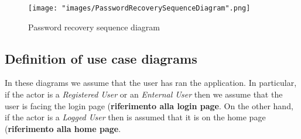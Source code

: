 \begin{figure}[H]
\begin{center}
\texttt{[image: "images/PasswordRecoverySequenceDiagram".png]}
\caption{Password recovery sequence diagram}
\label{img:seqDiagrPasswordRecovery}
\end{center}
\end{figure}



\subsection{Definition of use case diagrams}
In these diagrams we assume that the user has ran the application. In particular, if the actor is a \textit{Registered User} or an \textit{Enternal User} then we assume that the user is facing the login page (\textbf{riferimento alla login page}. On the other hand, if the actor is a \textit{Logged User} then is assumed that it is on the home page (\textbf{riferimento alla home page}.
